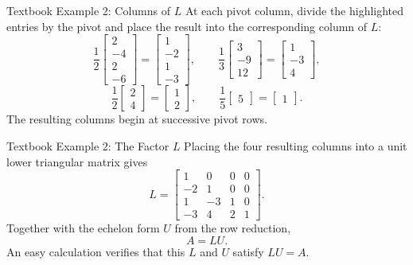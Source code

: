 \begin{frame}{Textbook Example 2: Columns of $L$}
At each pivot column, divide the highlighted entries by the pivot and place the result into the corresponding column of $L$:
\[
\frac{1}{2}\begin{bmatrix}2\\-4\\2\\-6\end{bmatrix}
=\begin{bmatrix}1\\-2\\1\\-3\end{bmatrix},
\qquad
\frac{1}{3}\begin{bmatrix}3\\-9\\12\end{bmatrix}
=\begin{bmatrix}1\\-3\\4\end{bmatrix},
\]
\[
\frac{1}{2}\begin{bmatrix}2\\4\end{bmatrix}
=\begin{bmatrix}1\\2\end{bmatrix},
\qquad
\frac{1}{5}\begin{bmatrix}5\end{bmatrix}
=\begin{bmatrix}1\end{bmatrix}.
\]
The resulting columns begin at successive pivot rows.
\end{frame}

\begin{frame}{Textbook Example 2: The Factor $L$}
Placing the four resulting columns into a unit lower triangular matrix gives
\[
L=\begin{bmatrix}
1&0&0&0\\
-2&1&0&0\\
1&-3&1&0\\
-3&4&2&1
\end{bmatrix}.
\]
Together with the echelon form $U$ from the row reduction,
\[
\boxed{A=LU}.
\]
An easy calculation verifies that this $L$ and $U$ satisfy $LU=A$.
\end{frame}



